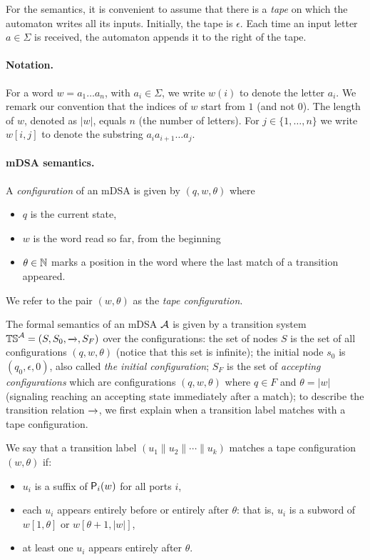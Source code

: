  For the semantics, it is convenient to assume that there is a \emph{tape} on which the automaton writes all its inputs. Initially, the tape is $\epsilon$. Each time an input letter $a \in \Sigma$ is received, the automaton appends it to the right of the tape. 
 
 \paragraph*{Notation.} For a word $w = a_1 \dots a_{n}$, with $a_i \in \Sigma$, we write $w(i)$ to denote the letter $a_i$. We remark our convention that the indices of $w$ start from $1$ (and not $0$). The length of $w$, denoted as $|w|$, equals $n$ (the number of letters). For $j \in \{1, \dots, n\}$ we write $w[i, j]$ to denote the substring $a_i a_{i+1} \dots a_j$.

  \paragraph*{mDSA semantics.} A \emph{configuration} of an mDSA is given by $(q, w, \theta)$ where
  \begin{itemize}
  \item $q$ is the current state,
  \item $w$ is the word read so far, from the beginning
  \item $\theta \in \mathbb{N}$ marks a position in the word where the last match of a transition appeared.  
  \end{itemize} 
  We refer to the pair $(w, \theta)$ as the \emph{tape configuration}.
  
  The formal semantics of an mDSA $\mathcal{A}$ is given by a transition system $\mathbb{TS}^{\mathcal{A}} = (S, S_0, \xrightarrow{}, S_F)$  over the configurations: the set of nodes $S$ is  the set of all configurations $(q, w, \theta)$ (notice that this set is infinite); the initial node $s_0$ is $(q_0, \epsilon, 0)$, also called \emph{the initial configuration}; $S_F$  is the set of \emph{accepting configurations} which are configurations $(q, w, \theta)$ where $q \in F$ and $\theta = |w|$ (signaling reaching an accepting state immediately after a match); to describe the transition relation $\xrightarrow{}$, we first explain when a transition label matches with a tape configuration. 

  \begin{definition}\label{def:match}
    We say that a transition label $(u_1 \parallel u_2 \parallel \cdots \parallel u_k)$ matches a tape configuration $(w, \theta)$ if:
    \begin{itemize}
      \item $u_i$ is a suffix of $\mathsf{P}_{i}(w)$ for all ports $i$,
      \item each $u_i$ appears entirely before or entirely after $\theta$: that is, $u_i$ is a subword of $w[1, \theta]$ or $w[\theta+1, |w|]$,
      \item at least one $u_i$ appears entirely after $\theta$.
    \end{itemize}
  \end{definition}


